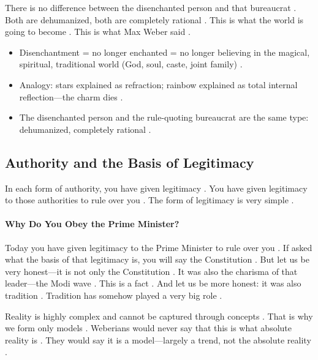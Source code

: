 \begin{CriticalPoint}
There is no difference between the disenchanted person and that bureaucrat . Both are dehumanized, both are completely rational .
This is what the world is going to become . This is what Max Weber said .
\end{CriticalPoint}

\begin{QuickRevision}
\begin{itemize}
    \item Disenchantment = no longer enchanted = no longer believing in the magical, spiritual, traditional world (God, soul, caste, joint family) .
    \item Analogy: stars explained as refraction; rainbow explained as total internal reflection---the charm dies .
    \item The disenchanted person and the rule-quoting bureaucrat are the same type: dehumanized, completely rational .
\end{itemize}
\end{QuickRevision}

\subsection{Authority and the Basis of Legitimacy}
In each form of authority, you have given legitimacy . You have given legitimacy to those authorities to rule over you . The form of legitimacy is very simple .

\paragraph{Why Do You Obey the Prime Minister?}
Today you have given legitimacy to the Prime Minister to rule over you . If asked what the basis of that legitimacy is, you will say the Constitution . But let us be very honest---it is not only the Constitution . It was also the charisma of that leader---the Modi wave . This is a fact . And let us be more honest: it was also tradition . Tradition has somehow played a very big role .

\begin{KeyConcept}
Reality is highly complex and cannot be captured through concepts . That is why we form only models .
Weberians would never say that this is what absolute reality is . They would say it is a model---largely a trend, not the absolute reality .
\end{KeyConcept}

